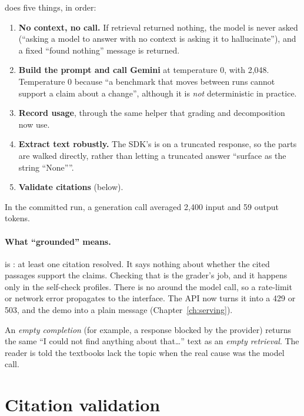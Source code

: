   does five things, in order:
\begin{enumerate}
  \item \textbf{No context, no call.} If retrieval returned nothing, the model is never asked (``asking a model to answer with no context is asking it to hallucinate''), and a fixed ``found nothing'' message is returned.
  \item \textbf{Build the prompt and call Gemini} at temperature 0, with  2,048. Temperature 0 because ``a benchmark that moves between runs cannot support a claim about a change'', although it is \emph{not} deterministic in practice.
  \item \textbf{Record usage}, through the same helper that grading and decomposition now use.
  \item \textbf{Extract text robustly.} The SDK's  is  on a truncated response, so the parts are walked directly, rather than letting a truncated answer ``surface as the string \enquote{None}''.
  \item \textbf{Validate citations} (below).
\end{enumerate}
In the committed  run, a generation call averaged 2,400 input and 59 output tokens.

\paragraph{What ``grounded'' means.}  is : at least one citation resolved. It says nothing about whether the cited passages support the claims. Checking that is the grader's job, and it happens only in the self-check profiles. There is no  around the model call, so a rate-limit or network error propagates to the interface. The API now turns it into a 429 or 503, and the demo into a plain message (Chapter~\ref{ch:serving}).

\begin{finding}
An \emph{empty completion} (for example, a response blocked by the provider) returns the same ``I could not find anything about that\ldots'' text as an \emph{empty retrieval}. The reader is told the textbooks lack the topic when the real cause was the model call.
\end{finding}

\section{Citation validation}
\label{sec:citations}


